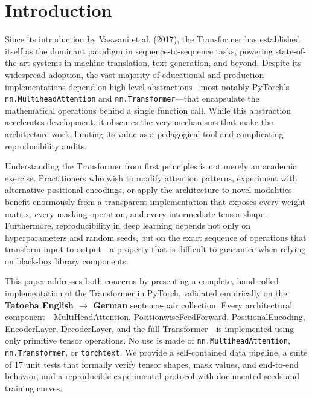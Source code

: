 \section{Introduction}

Since its introduction by Vaswani et al. (2017), the Transformer has established itself as the dominant paradigm in sequence-to-sequence tasks, powering state-of-the-art systems in machine translation, text generation, and beyond. Despite its widespread adoption, the vast majority of educational and production implementations depend on high-level abstractions---most notably PyTorch's \texttt{nn.MultiheadAttention} and \texttt{nn.Transformer}---that encapsulate the mathematical operations behind a single function call. While this abstraction accelerates development, it obscures the very mechanisms that make the architecture work, limiting its value as a pedagogical tool and complicating reproducibility audits.

Understanding the Transformer from first principles is not merely an academic exercise. Practitioners who wish to modify attention patterns, experiment with alternative positional encodings, or apply the architecture to novel modalities benefit enormously from a transparent implementation that exposes every weight matrix, every masking operation, and every intermediate tensor shape. Furthermore, reproducibility in deep learning depends not only on hyperparameters and random seeds, but on the exact sequence of operations that transform input to output---a property that is difficult to guarantee when relying on black-box library components.

This paper addresses both concerns by presenting a complete, hand-rolled implementation of the Transformer in PyTorch, validated empirically on the \textbf{Tatoeba English $\rightarrow$ German} sentence-pair collection. Every architectural component---MultiHeadAttention, PositionwiseFeedForward, PositionalEncoding, EncoderLayer, DecoderLayer, and the full Transformer---is implemented using only primitive tensor operations. No use is made of \texttt{nn.MultiheadAttention}, \texttt{nn.Transformer}, or \texttt{torchtext}. We provide a self-contained data pipeline, a suite of 17 unit tests that formally verify tensor shapes, mask values, and end-to-end behavior, and a reproducible experimental protocol with documented seeds and training curves.

